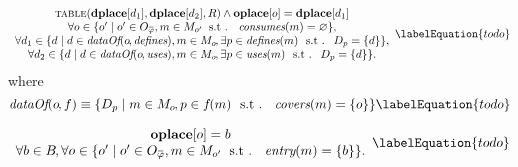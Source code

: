 \begin{equation}
  \begin{array}{c}
    \mTable(\mVar{dplace}[d_1], \mVar{dplace}[d_2], \mDomMatrix)
    \mAnd
    \mVar{oplace}[o] = \mVar{dplace}[d_1] \\
    \forall o \in
      \mSetBuilder{o'}%
                  {%
                    o' \in \mOpCompSet{\mPhi},
                    m \in \mMatchSet[o'] \hspace{-1pt}
                    \text{ \st }
                    \mConsumes(m) = \mEmptySet
                  }, \\
    \forall d_1 \in
      \mSetBuilder{d}%
                  {%
                    d \in \mDataOf(o \hspace{-1pt}, \mDefines),
                    m \in \mMatchSet[o] \hspace{-1pt},
                    \exists p \in \mDefines(m)
                    \text{ \st }
                    \mDataSet[p] = \mSet{d}
                  }, \\
    \forall d_2 \in
      \mSetBuilder{d}%
                  {%
                    d \in \mDataOf(o \hspace{-1pt}, \mUses),
                    m \in \mMatchSet[o] \hspace{-1pt},
                    \exists p \in \mUses(m)
                    \text{ \st }
                    \mDataSet[p] = \mSet{d}
                  }.
  \end{array}
  \labelEquation{todo}
\end{equation}
%
where
%
\begin{equation}
  \mDataOf(o \hspace{-1pt}, f)
  \equiv
  \mSetBuilder{\mDataSet[p]}%
              {%
                m \in \mMatchSet[o] \hspace{-1pt},
                p \in f\hspace{-1pt}(m)
                \text{ \st }
                \mCovers(m) = \mSet{o}
              }
  \labelEquation{todo}
\end{equation}



\begin{equation}
  \begin{array}{c}
    \mVar{oplace}[o] = b \\
    \forall b \in \mBlockSet \hspace{-1pt},
    \forall o \in
      \mSetBuilder{o'}%
                  {%
                    o' \in \mOpCompSet{\mPhi},
                    m \in \mMatchSet[o'] \hspace{-1pt}
                    \text{ \st }
                    \mEntry(m) = \mSet{b}
                  }.
  \end{array}
  \labelEquation{todo}
\end{equation}

